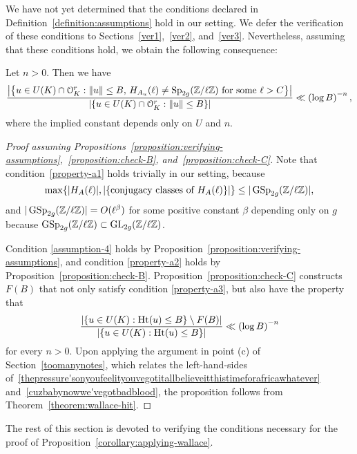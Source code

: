 We have not yet determined that the conditions declared in Definition~\ref{definition:assumptions} hold in our setting. We defer the verification of these conditions to Sections~\ref{ver1},~\ref{ver2}, and~\ref{ver3}. Nevertheless, assuming that these conditions hold, we obtain the following consequence:
	\begin{proposition} \label{corollary:applying-wallace}
		Let $n>0$. Then we have
		\begin{equation}\label{cuzbabynowwe'vegotbadblood}
			\frac{\left|\left\{ u \in U(K) \cap \mathcal{O}_K^r : \|u \| \leq B,\, H_{A_u}(\ell) \neq \operatorname{Sp}_{2g}(\mathbb Z/ \ell \mathbb Z) \text{ for some } \ell  > C \right\}\right|}{\left|\left\{ u \in U(K) \cap \mathcal O_K^r : \|u \| \leq B \right\} \right|} \ll \left( \log B \right)^{-n},
		\end{equation}
        where the implied constant depends only on $U$ and $n$.
	\end{proposition}
	\begin{proof}[Proof assuming Propositions~\ref{proposition:verifying-assumptions},~\ref{proposition:check-B}, and~\ref{proposition:check-C}]
Note that condition~\ref{property-a1} holds trivially in our setting, because
\[
	\max\{|H_A(\ell)|, |\{\text{conjugacy classes of $H_A(\ell)$}\}|\} \leq |\operatorname{GSp}_{2g}(\mathbb Z/\ell \mathbb Z)|,
\]
and $|\operatorname{GSp}_{2g}(\mathbb Z/\ell \mathbb Z)| = O(\ell^\beta)$ for some positive constant $\beta$ depending only on $g$ because $\operatorname{GSp}_{2g}({\mathbb Z}/\ell{\mathbb Z}) \subset \operatorname{GL}_{2g}({\mathbb Z}/\ell{\mathbb Z})$.

Condition \ref{assumption-4} holds by Proposition~\ref{proposition:verifying-assumptions}, and condition \ref{property-a2} holds by Proposition~\ref{proposition:check-B}. Proposition~\ref{proposition:check-C} constructs $F(B)$ that not only satisfy condition \ref{property-a3}, but also have the property that
		\begin{equation*}
			\frac{|\{u \in U(K) : \operatorname{Ht}(u) \le B\} \setminus F(B) |}{|\{u \in U(K) : \operatorname{Ht}(u) \le B\}|} \ll \left( \log B \right)^{-n}
            \end{equation*}
            for every $n >0$. Upon applying the argument in point (c) of Section~\ref{toomanynotes}, which relates the left-hand-sides of~\eqref{thepressure'sonyoufeelityouvegotitallbelieveitthistimeforafricawhatever} and~\eqref{cuzbabynowwe'vegotbadblood}, the proposition follows from Theorem~\ref{theorem:wallace-hit}.		
	\end{proof}

The rest of this section is devoted to verifying the conditions necessary for the proof of Proposition~\ref{corollary:applying-wallace}.
	
